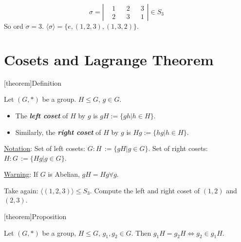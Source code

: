 \documentclass[12pt]{report}
\theoremstyle{definition}
\begin{document}
\begin{ex}
    \[
        \sigma = \left|
        \begin{align*}
            & 1 && 2 && 3 \\
            & 2 && 3 && 1
        \end{align*}
        \right| \in{}S_3
    \]So ord $\sigma = 3$.
    $\langle \sigma \rangle = \{ e, (1, 2, 3), (1, 3, 2)\}$.
\end{ex}

\section{Cosets and Lagrange Theorem}

[theorem]{Definition}
\begin{cosets}
    Let $(G, *)$ be a group. $H \le G$, $g \in G$.
    \begin{itemize}
            \item The \textbf{\emph{left coset}} of $H$ by $g$ is $gH := \{gh | h \in H\}$.
            \item Similarly, the \textbf{\emph{right coset}} of $H$ by $g$ is $Hg := \{hg | h \in H\}$.
    \end{itemize}
    
\end{cosets}

\underline{Notation}: Set of left cosets: $G:H \,:= \{gH | g \in G\}$.
Set of right cosets: $H:G \,:= \{Hg | g \in G\}$.

\underline{Warning}: If $G$ is Abelian, $gH = Hg \forall g$.

\begin{ex}
    Take again: $\langle (1, 2, 3)\rangle \le S_3$.
    Compute the left and right coset of $(1, 2)$ and $(2, 3)$.
\end{ex}

[theorem]{Proposition}
\begin{coset property}
    Let $(G, *)$ be a group, $H \le G$, $g_1, g_2 \in G$.
    Then $g_1 H = g_2 H \iff g_2 \in g_1 H$.
\end{coset property}
\end{document}

